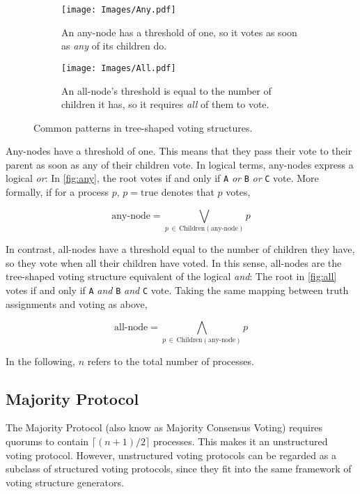 \documentclass[11pt,chapterprefix=true,toc=bibliography,numbers=noendperiod,
               footnotes=multiple,twoside]{scrreprt}
\begin{document}
\begin{figure}[h]
    \centering
    \begin{subfigure}[t]{0.4\textwidth}
        \texttt{[image: Images/Any.pdf]}
        \caption{An any-node has a threshold of one, so it votes as soon as \emph{any} of its children do.}
        \label{fig:any}
    \end{subfigure}
    \quad
    \begin{subfigure}[t]{0.4\textwidth}
        \texttt{[image: Images/All.pdf]}
        \caption{An all-node's threshold is equal to the number of children it has, so it requires \emph{all} of them to vote.}
        \label{fig:all}
    \end{subfigure}
    \caption{Common patterns in tree-shaped voting structures.}
    \label{fig:tsvs-patterns}
\end{figure}

Any-nodes have a threshold of one. This means that they pass their vote to their parent as soon as any of their children vote. In logical terms, any-nodes express a logical \emph{or}: In \autoref{fig:any}, the root votes if and only if \texttt{A} \emph{or} \texttt{B} \emph{or} \texttt{C} vote. More formally, if for a process \(p\), \(p = \text{true}\) denotes that \(p\) votes,

\[ \text{any-node} = \bigvee_{p\,\in\,\text{Children}(\text{any-node})} p \]

In contrast, all-nodes have a threshold equal to the number of children they have, so they vote when all their children have voted. In this sense, all-nodes are the tree-shaped voting structure equivalent of the logical \emph{and}: The root in \autoref{fig:all} votes if and only if \texttt{A} \emph{and} \texttt{B} \emph{and} \texttt{C} vote. Taking the same mapping between truth assignments and voting as above,

\[ \text{all-node} = \bigwedge_{p\,\in\,\text{Children}(\text{any-node})} p \]

In the following, \(n\) refers to the total number of processes.

\subsection{Majority Protocol}

The Majority Protocol (also know as Majority Consensus Voting\autocite{majority}) requires quorums to contain \(\lceil (n + 1) / 2 \rceil\) processes. This makes it an unstructured voting protocol. However, unstructured voting protocols can be regarded as a subclass of structured voting protocols, since they fit into the same framework of voting structure generators.
\end{document}
